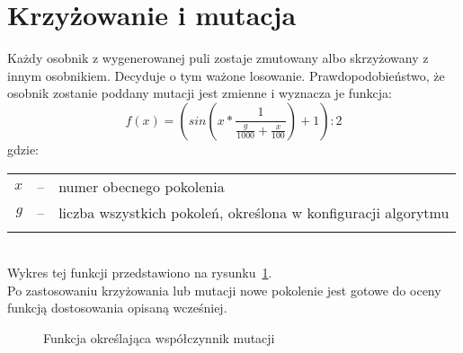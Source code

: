\section*{Krzyżowanie i mutacja}
Każdy osobnik z wygenerowanej puli zostaje zmutowany albo skrzyżowany z innym osobnikiem. Decyduje o tym ważone losowanie. Prawdopodobieństwo, że osobnik zostanie poddany mutacji jest zmienne i wyznacza je funkcja:
\[ f(x) = (sin(x * \frac{1}{\frac{g}{1000}+\frac{x}{100}})+1) : 2 \]
gdzie:\\
\begin{tabularx}{\textwidth}{ r c l }
	$x$ & -- & numer obecnego pokolenia\\
	$g$ & -- & liczba wszystkich pokoleń, określona w konfiguracji algorytmu\\
	&&\\
\end{tabularx}\\
Wykres tej funkcji przedstawiono na rysunku~\ref{fig:mutRate}. \\ Po zastosowaniu krzyżowania lub mutacji nowe pokolenie jest gotowe do oceny funkcją dostosowania opisaną wcześniej.

\begin{figure}[h]	
	\caption{Funkcja określająca współczynnik mutacji}
	\label{fig:mutRate}
\end{figure}